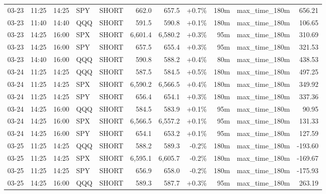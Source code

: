 \documentclass[11pt,a4paper,twoside]{article}
\begin{document}
\begin{center}
\begin{longtable}{>{\color{txtmain}}l l l l l r r r r >{\color{txtmain}}l r}
03-23 & 11:25 & 14:25 & SPY & SHORT & 662.0 & 657.5 & \textcolor{wingreen}{+0.7\%} & 180m & max\_time\_180m & \textcolor{wingreen}{656.21} \\
03-23 & 11:40 & 14:40 & QQQ & SHORT & 591.5 & 590.8 & \textcolor{wingreen}{+0.1\%} & 180m & max\_time\_180m & \textcolor{wingreen}{106.65} \\
03-23 & 14:25 & 16:00 & SPX & SHORT & 6,601.4 & 6,580.2 & \textcolor{wingreen}{+0.3\%} & 95m & max\_time\_180m & \textcolor{wingreen}{310.69} \\
03-23 & 14:25 & 16:00 & SPY & SHORT & 657.5 & 655.4 & \textcolor{wingreen}{+0.3\%} & 95m & max\_time\_180m & \textcolor{wingreen}{321.53} \\
03-23 & 14:40 & 16:00 & QQQ & SHORT & 590.8 & 588.2 & \textcolor{wingreen}{+0.4\%} & 80m & max\_time\_180m & \textcolor{wingreen}{438.53} \\
03-24 & 11:25 & 14:25 & QQQ & SHORT & 587.5 & 584.5 & \textcolor{wingreen}{+0.5\%} & 180m & max\_time\_180m & \textcolor{wingreen}{497.25} \\
03-24 & 11:25 & 14:25 & SPX & SHORT & 6,590.2 & 6,566.5 & \textcolor{wingreen}{+0.4\%} & 180m & max\_time\_180m & \textcolor{wingreen}{349.92} \\
03-24 & 11:25 & 14:25 & SPY & SHORT & 656.4 & 654.1 & \textcolor{wingreen}{+0.3\%} & 180m & max\_time\_180m & \textcolor{wingreen}{337.36} \\
03-24 & 14:25 & 16:00 & QQQ & SHORT & 584.5 & 583.9 & \textcolor{wingreen}{+0.1\%} & 95m & max\_time\_180m & \textcolor{wingreen}{90.95} \\
03-24 & 14:25 & 16:00 & SPX & SHORT & 6,566.5 & 6,557.2 & \textcolor{wingreen}{+0.1\%} & 95m & max\_time\_180m & \textcolor{wingreen}{131.33} \\
03-24 & 14:25 & 16:00 & SPY & SHORT & 654.1 & 653.2 & \textcolor{wingreen}{+0.1\%} & 95m & max\_time\_180m & \textcolor{wingreen}{127.59} \\
03-25 & 11:25 & 14:25 & QQQ & SHORT & 588.2 & 589.3 & \textcolor{lossred}{-0.2\%} & 180m & max\_time\_180m & \textcolor{lossred}{-193.60} \\
03-25 & 11:25 & 14:25 & SPX & SHORT & 6,595.1 & 6,605.7 & \textcolor{lossred}{-0.2\%} & 180m & max\_time\_180m & \textcolor{lossred}{-169.67} \\
03-25 & 11:25 & 14:25 & SPY & SHORT & 656.9 & 658.0 & \textcolor{lossred}{-0.2\%} & 180m & max\_time\_180m & \textcolor{lossred}{-175.93} \\
03-25 & 14:25 & 16:00 & QQQ & SHORT & 589.3 & 587.7 & \textcolor{wingreen}{+0.3\%} & 95m & max\_time\_180m & \textcolor{wingreen}{263.19} \\

\end{longtable}
\end{center}
\end{document}
